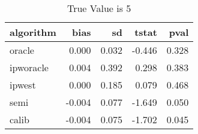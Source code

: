 \begin{table}[h!]

\caption{True Value is 5}
\centering
\begin{tabular}[t]{lrrrr}
\toprule
algorithm & bias & sd & tstat & pval\\
\midrule
oracle & 0.000 & 0.032 & -0.446 & 0.328\\
ipworacle & 0.004 & 0.392 & 0.298 & 0.383\\
ipwest & 0.000 & 0.185 & 0.079 & 0.468\\
semi & -0.004 & 0.077 & -1.649 & 0.050\\
calib & -0.004 & 0.075 & -1.702 & 0.045\\
\bottomrule
\end{tabular}
\end{table}
